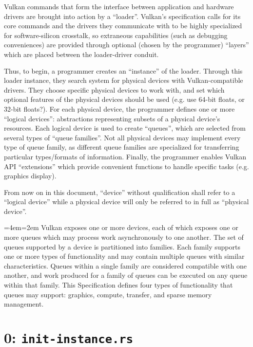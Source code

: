 \documentclass[12pt,letterpaper]{article}
\newcommand{\inquotes}[1]{``#1''}	%
\newenvironment{indenttext}{%
	\par%
	\medskip
	\leftskip=4em\rightskip=2em%
	\noindent\ignorespaces}{%
	\par\medskip}
\renewenvironment{quotation}{\begin{indenttext}\fontfamily{LinuxLibertineT-OsF}\selectfont}{\end{indenttext}}
\begin{document}
Vulkan commands that form the interface between application and hardware drivers are brought into action by a \inquotes{loader}. Vulkan's specification calls for its core commands and the drivers they communicate with to be highly specialized for software-silicon crosstalk, so extraneous capabilities (such as debugging conveniences) are provided through optional (chosen by the programmer) \inquotes{layers} which are placed between the loader-driver conduit.    

Thus, to begin, a programmer creates an \inquotes{instance} of the loader. Through this loader instance, they search system for physical devices with Vulkan-compatible drivers. They choose specific physical devices to work with, and set which optional features of the physical devices should be used (e.g. use 64-bit floats, or 32-bit floats?). For each physical device, the programmer defines one or more \inquotes{logical devices}: abstractions representing subsets of a physical device's resources. Each logical device is used to create \inquotes{queues}, which are selected from several types of \inquotes{queue families}. Not all physical devices may implement every type of queue family, as different queue families are specialized for transferring particular types/formats of information. Finally, the programmer enables Vulkan API \inquotes{extensions} which provide convenient functions to handle specific tasks (e.g. graphics display).

From now on in this document, \inquotes{device} without qualification shall refer to a \inquotes{logical device} while a physical device will only be referred to in full as \inquotes{physical device}.

\begin{quotation}
    Vulkan exposes one or more devices, each of which exposes one or more queues which may process work asynchronously to one another. The set of queues supported by a device is partitioned into families. Each family supports one or more types of functionality and may contain multiple queues with similar characteristics. Queues within a single family are considered compatible with one another, and work produced for a family of queues can be executed on any queue within that family. This Specification defines four types of functionality that queues may support: graphics, compute, transfer, and sparse memory management.
\end{quotation}

\section{0: \texttt{init-instance.rs}}
\end{document}
